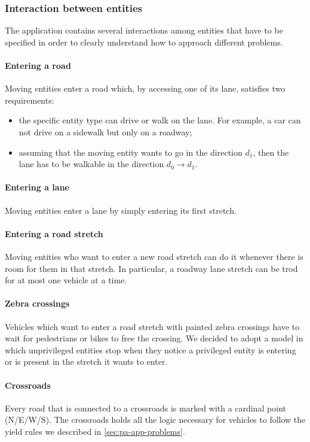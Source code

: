 \subsubsection{Interaction between entities}

The application contains several interactions among entities that have to be
specified in order to clearly understand how to approach different problems.

\paragraph{Entering a road} Moving entities enter a road which, by accessing
one of its lane, satisfies two requirements:

\begin{itemize}
  \item the specific entity type can drive or walk on the lane. For example,
  a car can not drive on a sidewalk but only on a roadway;
  \item assuming that the moving entity wants to go in the direction $d_1$,
    then the lane has to be walkable in the direction $d_0 \rightarrow d_1$.
\end{itemize}

\paragraph{Entering a lane}
Moving entities enter a lane by simply entering its first stretch.

\paragraph{Entering a road stretch}
Moving entities who want to enter a new road stretch can do it whenever there
is room for them in that stretch.
In particular, a roadway lane stretch can be trod for at most one vehicle at a
time.

\paragraph{Zebra crossings}
Vehicles which want to enter a road stretch with painted zebra crossings have
to wait for pedestrians or bikes to free the crossing.
We decided to adopt a model in which unprivileged entities stop when they
notice a privileged entity is entering or is present in the stretch it wants
to enter.

\paragraph{Crossroads} Every road that is connected to a crossroads is marked
with a cardinal point (N/E/W/S). The crossroads holds all the logic necessary
for vehicles to follow the yield rules we described in
\ref{sec:pa-app-problems}.

